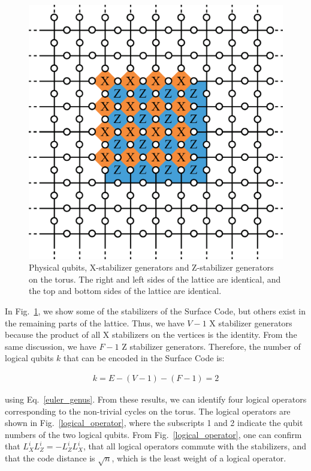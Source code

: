 \documentclass[a4paper,11pt]{ltjsarticle}
\begin{document}
{{        \begin{figure}[h]
            \centering
            \includegraphics[scale=0.40]{figure/local.eps}
            \vspace{0pt}\caption{Physical qubits, X-stabilizer generators and Z-stabilizer generators on the torus. The right and left sides of the lattice are identical, and the top and bottom sides of the lattice are identical.}
            \label{local}
        \end{figure}
    
        In Fig.~\ref{local}, we show some of the stabilizers of the Surface Code, but others exist in the remaining parts of the lattice. Thus, we have $V - 1$ X stabilizer generators because the product of all X stabilizers on the vertices is the identity. From the same discussion, we have $F - 1$ Z stabilizer generators. Therefore, the number of logical qubits $k$ that can be encoded in the Surface Code is:

    \begin{align}
        k = E - (V - 1) - (F - 1) = 2
    \end{align} 

    using Eq.~\ref{euler_genus}. From these results, we can identify four logical operators corresponding to the non-trivial cycles on the torus. The logical operators are shown in Fig.~\ref{logical_operator}, where the subscripts 1 and 2 indicate the qubit numbers of the two logical qubits. From Fig.~\ref{logical_operator}, one can confirm that $L^i_XL^i_Z = -L^i_ZL^i_X$, that all logical operators commute with the stabilizers, and that the code distance is $\sqrt{n}$, which is the least weight of a logical operator. 

}}
\end{document}
